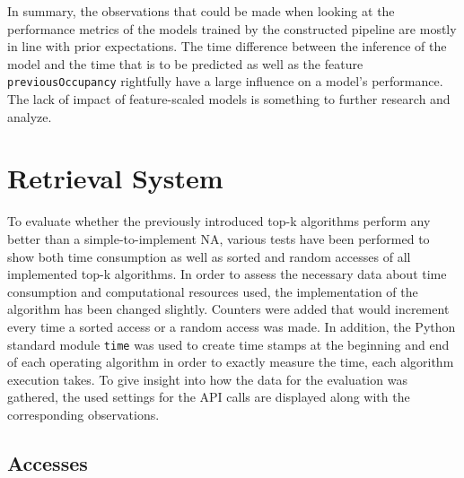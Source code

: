   In summary, the observations that could be made when looking at the performance metrics of the models trained by the constructed pipeline are mostly in line with prior expectations. The time difference between the inference of the model and the time that is to be predicted as well as the feature \texttt{previousOccupancy} rightfully have a large influence on a model's performance. The lack of impact of feature-scaled models is something to further research and analyze.
  
  
  
  \section{Retrieval System}

To evaluate whether the previously introduced top-k algorithms perform any better than a simple-to-implement NA, various tests have been performed to show both time consumption as well as sorted and random accesses of all implemented top-k algorithms. In order to assess the necessary data about time consumption and computational resources used, the implementation of the algorithm has been changed slightly. Counters were added that would increment every time a sorted access or a random access was made. In addition, the Python standard module \texttt{time} was used to create time stamps at the beginning and end of each operating algorithm in order to exactly measure the time, each algorithm execution takes. 
To give insight into how the data for the evaluation was gathered, the used settings for the API calls are displayed along with the corresponding observations. 



\subsection{Accesses}

